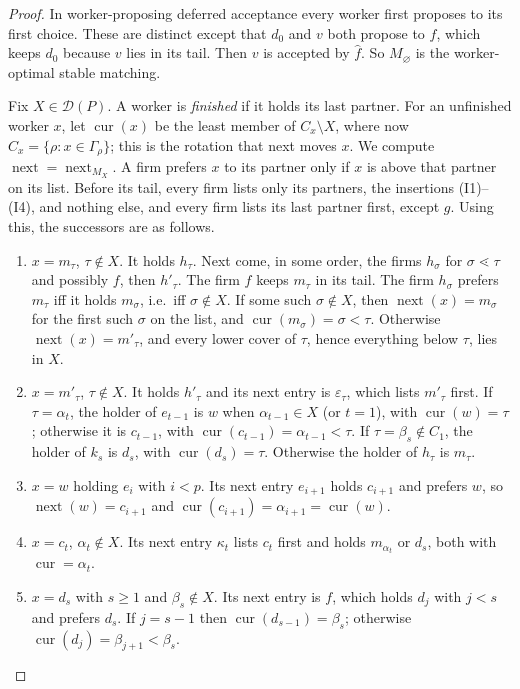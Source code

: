 \documentclass[11pt]{amsart}
\theoremstyle{definition}
\theoremstyle{remark}
\newcommand{\D}{\mathcal D}
\newcommand{\cur}{\operatorname{cur}}
\newcommand{\nxt}{\operatorname{next}}
\begin{document}
\begin{proof}
In worker-proposing deferred acceptance every worker first proposes to its first choice. These are distinct except that $d_0$ and $v$ both propose to $f$, which keeps $d_0$ because $v$ lies in its tail. Then $v$ is accepted by $\hat f$. So $M_\varnothing$ is the worker-optimal stable matching.

Fix $X\in\D(P)$. A worker is \emph{finished} if it holds its last partner. For an unfinished worker $x$, let $\cur(x)$ be the least member of $C_x\setminus X$, where now $C_x=\{\rho:x\in\Gamma_\rho\}$; this is the rotation that next moves $x$. We compute $\nxt=\nxt_{M_X}$. A firm prefers $x$ to its partner only if $x$ is above that partner on its list. Before its tail, every firm lists only its partners, the insertions (I1)--(I4), and nothing else, and every firm lists its last partner first, except $g$. Using this, the successors are as follows.
\begin{enumerate}[label=(\roman*)]
\item $x=m_\tau$, $\tau\notin X$. It holds $h_\tau$. Next come, in some order, the firms $h_\sigma$ for $\sigma\lessdot\tau$ and possibly $f$, then $h'_\tau$. The firm $f$ keeps $m_\tau$ in its tail. The firm $h_\sigma$ prefers $m_\tau$ iff it holds $m_\sigma$, i.e.\ iff $\sigma\notin X$. If some such $\sigma\notin X$, then $\nxt(x)=m_\sigma$ for the first such $\sigma$ on the list, and $\cur(m_\sigma)=\sigma<\tau$. Otherwise $\nxt(x)=m'_\tau$, and every lower cover of $\tau$, hence everything below $\tau$, lies in $X$.
\item $x=m'_\tau$, $\tau\notin X$. It holds $h'_\tau$ and its next entry is $\varepsilon_\tau$, which lists $m'_\tau$ first. If $\tau=\alpha_t$, the holder of $e_{t-1}$ is $w$ when $\alpha_{t-1}\in X$ (or $t=1$), with $\cur(w)=\tau$; otherwise it is $c_{t-1}$, with $\cur(c_{t-1})=\alpha_{t-1}<\tau$. If $\tau=\beta_s\notin C_1$, the holder of $k_s$ is $d_s$, with $\cur(d_s)=\tau$. Otherwise the holder of $h_\tau$ is $m_\tau$.
\item $x=w$ holding $e_i$ with $i<p$. Its next entry $e_{i+1}$ holds $c_{i+1}$ and prefers $w$, so $\nxt(w)=c_{i+1}$ and $\cur(c_{i+1})=\alpha_{i+1}=\cur(w)$.
\item $x=c_t$, $\alpha_t\notin X$. Its next entry $\kappa_t$ lists $c_t$ first and holds $m_{\alpha_t}$ or $d_s$, both with $\cur=\alpha_t$.
\item $x=d_s$ with $s\ge1$ and $\beta_s\notin X$. Its next entry is $f$, which holds $d_j$ with $j<s$ and prefers $d_s$. If $j=s-1$ then $\cur(d_{s-1})=\beta_s$; otherwise $\cur(d_j)=\beta_{j+1}<\beta_s$.

\end{enumerate}
\end{proof}
\end{document}
